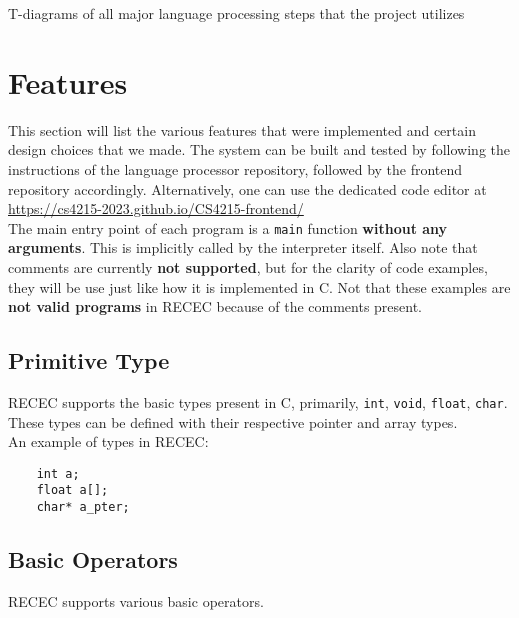 \documentclass[a4paper]{article}
\begin{document}
T-diagrams of all major language processing steps that the project utilizes

\section{Features}


This section will list the various features that were implemented and certain design choices that we made. The system can be built and tested by following the instructions of the language processor repository, followed by the frontend repository accordingly. Alternatively, one can use the dedicated code editor at \url{https://cs4215-2023.github.io/CS4215-frontend/}
\\

The main entry point of each program is a \texttt{main} function \textbf{without any arguments}. This is implicitly called by the interpreter itself. Also note that comments are currently \textbf{not supported}, but for the clarity of code examples, they will be use just like how it is implemented in C. Not that these examples are \textbf{not valid programs} in RECEC because of the comments present.  

\subsection{Primitive Type}
\label{types}
RECEC supports the basic types present in C, primarily, \texttt{int}, \texttt{void}, \texttt{float}, \texttt{char}. These types can be defined with their respective pointer and array types. \\

An example of types in RECEC:

\begin{verbatim}
	int a;
	float a[];
	char* a_pter;
\end{verbatim}

\subsection{Basic Operators}
RECEC supports various basic operators.
\end{document}
